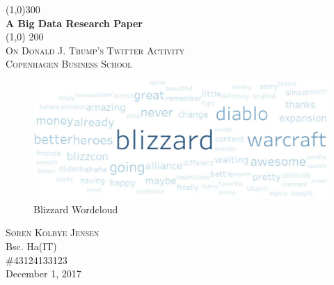 \documentclass{article}
\begin{document}
\begin{titlepage}
	\begin{center}
	\line(1,0){300} \\
	[0.25in]
	\color{NavyBlue} \huge{\bfseries A Big Data Research Paper} \\   
	[2mm]	
	\color{black}
	\line(1,0) {200} \\
	[0.1cm]
	\color{black}\textsc{\LARGE On Donald J. Trump's Twitter Activity} \\
	[0.75cm]
	\textsc{\LARGE Copenhagen Business School} \\
	[9.5cm]




\end{center}



\begin{figure}[H]
	\centering

%

\vspace*{-12cm} 
\includegraphics[scale=.55]{BlizzardWord2Cloud.PNG}



\caption{ Blizzard Wordcloud }
\vspace*{1.25cm} 


\end{figure}


	\begin{flushright}
\vspace*{1.25cm} 

	\textsc{\large Søren Kolbye Jensen \\}
	Bsc. Ha(IT) \\
	\#43124133123 \\
	December 1, 2017
	\end{flushright}





\end {titlepage}
\end{document}
